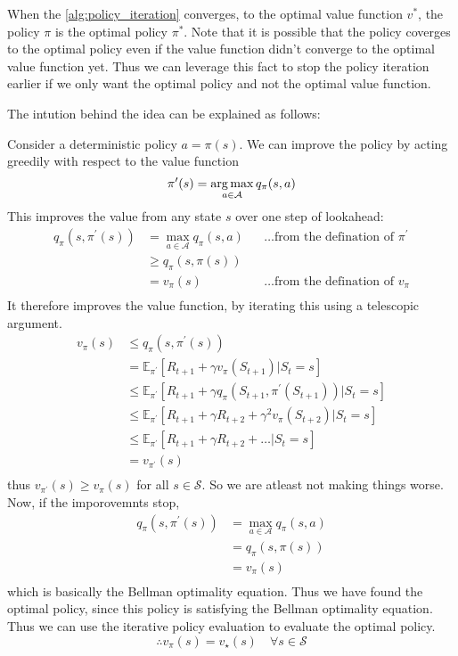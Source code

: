 When the \autoref{alg:policy_iteration} converges, 
to the optimal value function \(v^{*}\), the policy \(\pi\) is the optimal policy \(\pi^{*}\).
Note that it is possible that the policy coverges to the optimal policy even if the value function
didn't converge to the optimal value function yet. Thus we can leverage this fact to stop the
policy iteration earlier if we only want the optimal policy and not the optimal value function.


The intution behind the idea can be explained as follows:

Consider a deterministic policy \(a = \pi(s)\). We can improve the policy by acting
greedily with respect to the value function
\[
        \pi^{\prime}(s) = \operatorname*{arg\,max}_{a \in \mathcal{A}} q_{\pi}(s,a)
\]
This improves the value from any state \(s\) over one step of lookahead:
\[
    \begin{aligned}
            q_{\pi}(s, \pi^{\prime}(s)) 
            &= \max_{a \in \mathcal{A}} q_{\pi}(s,a) &&\dots\text{from the 
            defination of \(\pi ^{\prime}\)}\\
            &\geq q_{\pi}(s, \pi(s))\\
            &= v_{\pi}(s) &&\dots\text{from the defination of \(v_{\pi}\)}\\
    \end{aligned}
\]
It therefore improves the value function, by iterating this using a telescopic argument.
\[
        \begin{aligned}
            v_\pi (s) &\leq q_{\pi}(s, \pi^{\prime}(s)) \\
            &= \mathbb{E}_{\pi^{\prime}} \left[ R_{t+1} + \gamma v_{\pi}(S_{t+1}) |
             S_{t} = s \right] \\
                &\leq \mathbb{E}_{\pi^{\prime}} \left[ R_{t+1} + \gamma q_{\pi}(S_{t+1}, \pi^{\prime}(S_{t+1})) |
                S_{t} = s \right] \\
                &\leq \mathbb{E}_{\pi^{\prime}} \left[ R_{t+1} + \gamma R_{t+2} + \gamma^{2} v_{\pi}(S_{t+2}) |
                S_{t} = s \right] \\
                &\leq \mathbb{E}_{\pi^{\prime}} \left[ R_{t+1} + \gamma R_{t+2} + \dots |
                S_{t} = s \right] \\
                &= v_{\pi^{\prime}}(s) \\
        \end{aligned}  
\]
thus \(v_{\pi^{\prime}}(s) \geq v_{\pi}(s)\) for all \(s \in \mathcal{S}\). So we are
atleast not making things worse. Now, if the imporovemnts stop,
\[
    \begin{aligned}
        q_\pi (s, \pi^{\prime}(s)) &= \max_{a \in \mathcal{A}} q_{\pi}(s,a) \\
        &= q_{\pi}(s, \pi(s)) \\
        &= v_{\pi}(s) \\ 
    \end{aligned}
\]
which is basically the Bellman optimality equation. Thus we have found the optimal policy, 
since this policy is satisfying the Bellman optimality equation. Thus we can use the iterative
policy evaluation to evaluate the optimal policy.
\[
    \therefore v_\pi (s) = v_{\star} (s) \quad \forall s \in \mathcal{S}
\]

